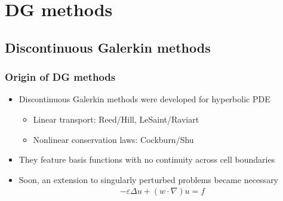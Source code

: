 \section{DG methods}

\subsection{Discontinuous Galerkin methods}

\begin{frame}
  \frametitle{Origin of DG methods}
  \begin{itemize}
  \item Discontinuous Galerkin methods were developed for hyperbolic PDE
    \begin{itemize}
    \item Linear transport: Reed/Hill, LeSaint/Raviart
    \item Nonlinear conservation laws: Cockburn/Shu
    \end{itemize}
  \item They feature basis functions with no continuity across cell boundaries
  \item Soon, an extension to singularly perturbed problems became
    necessary
    \begin{gather*}
      -\varepsilon\Delta u + (w\!\cdot\!\nabla) u = f
    \end{gather*}
  \end{itemize}
\end{frame}


